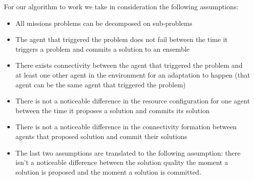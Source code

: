 \documentclass[journal]{IEEEtran}
\theoremstyle{definition}
\begin{document}
 
 For our algorithm to work we take in consideration the following assumptions:
\begin{itemize}
\item All missions problems can be decomposed on sub-problems
\item The agent that triggered the problem does not fail between the time it triggers a problem and commits a solution to an ensemble %
\item There exists connectivity between the agent that triggered the problem and at least one other agent in the environment for an adaptation to happen (that agent can be the same agent that triggered the problem)
\item There is not a noticeable difference in the resource configuration for one agent %
between the time it proposes a solution and commits its solution
\item There is not a noticeable difference in the %
connectivity formation between agents that proposed solution and commit their solutions
\item The last two assumptions are translated to the following assumption: %
there isn't a noticeable difference between the  solution  quality the moment  a solution is proposed and the moment a solution is committed.
\end{itemize}
\end{document}
